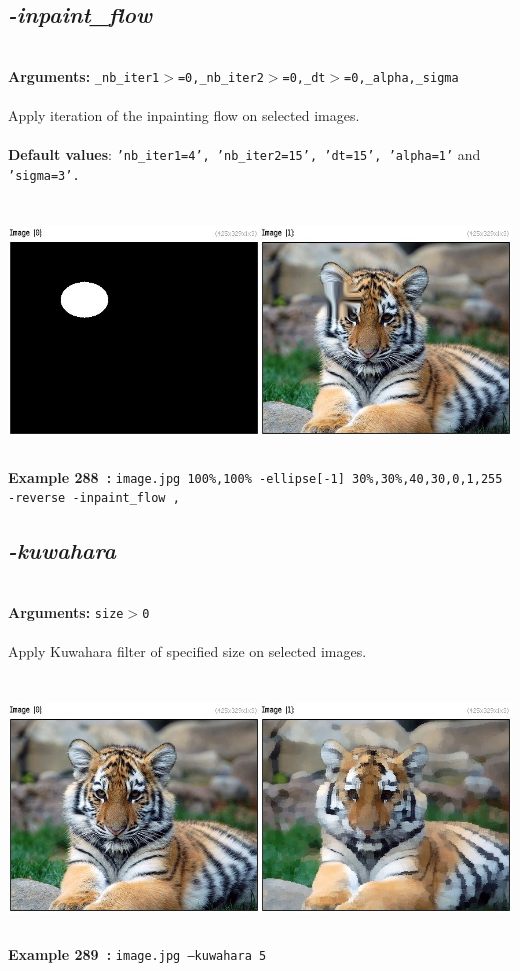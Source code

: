\documentclass[a4paper,11pt,twoside]{book}
\begin{document}
\subsection{\emph{-inpaint\_flow} }\vspace*{-0.5em}
~\\\textbf{Arguments: } 
{\small \texttt{\_nb\_iter1$>$=0,\_nb\_iter2$>$=0,\_dt$>$=0,\_alpha,\_sigma}}\\~\\
Apply iteration of the inpainting flow on selected images.
~\\~\\\textbf{Default values}: {\small \texttt{'nb\_iter1=4', 'nb\_iter2=15', 'dt=15', 'alpha=1'} and \texttt{'sigma=3'.}}
\begin{center}\includegraphics[keepaspectratio=true,height=7cm,width=\textwidth]{img/gmic_def288.jpg}\\
{\footnotesize \textbf{Example 288~:} \texttt{image.jpg 100\%,100\% -ellipse[-1] 30\%,30\%,40,30,0,1,255 -reverse -inpaint\_flow ,}}
\end{center}

\subsection{\emph{-kuwahara} }\vspace*{-0.5em}
~\\\textbf{Arguments: } 
{\small \texttt{size$>$0}}\\~\\
Apply Kuwahara filter of specified size on selected images.
\begin{center}\includegraphics[keepaspectratio=true,height=7cm,width=\textwidth]{img/gmic_def289.jpg}\\
{\footnotesize \textbf{Example 289~:} \texttt{image.jpg --kuwahara 5}}
\end{center}
\end{document}
